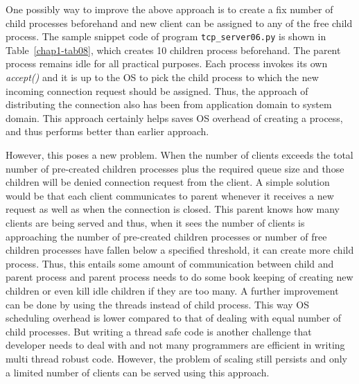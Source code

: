 \begin{multicols}{2}

One possibly way to improve the above approach is to create a fix number of child processes beforehand and new client can be assigned to any of the free child process. The sample snippet code of program \texttt{tcp\_server06.py}\cite{art1-key04} is shown in Table~\ref{chap1-tab08}, which creates 10 children process beforehand. The parent process remains idle for all practical purposes. Each process invokes its own \textit{accept()} and it is up to the OS to pick the child process to which the new incoming connection request should be assigned.  Thus, the approach of distributing the connection also has been from application domain to system domain. This approach certainly helps saves OS overhead of creating a process, and thus performs better than earlier approach.

However, this poses a new problem. When the number of clients exceeds the total number of pre-created children processes plus the required queue size and those children will be denied connection request from the client. A simple solution would be that each client communicates to parent whenever it receives a new request as well as when the connection is closed. This parent knows how many clients are being served and thus, when it sees the number of clients is approaching the number of pre-created children processes or number of free children processes have fallen below a specified threshold, it can create more child process. Thus, this entails some amount of communication between child and parent process and parent process needs to do some book keeping of creating new children or even kill idle children if they are too many. A further improvement can be done by using the threads instead of child process. This way OS scheduling overhead is lower compared to that of dealing with equal number of child processes. But writing a thread safe code is another challenge that developer needs to deal with and not many programmers are efficient in writing multi thread robust code. However, the problem of scaling still persists and only a limited number of clients can be served using this approach. 



\end{multicols}
